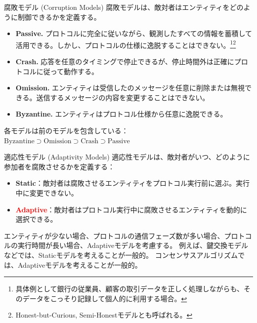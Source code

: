 \documentclass[aspectratio=169,10pt]{beamer}
\newenvironment{outlineblock}[1][]
{\begin{tcolorbox}[colframe=black, colback=white, boxrule=1pt, boxsep=5pt]}
{\end{tcolorbox}}
\begin{document}
\begin{frame}{腐敗モデル (Corruption Models)}
腐敗モデルは、敵対者はエンティティをどのように制御できるかを定義する。

\vspace{0.5em}

\begin{itemize}
    \item \textbf{Passive. }プロトコルに完全に従いながら、観測したすべての情報を蓄積して活用できる。しかし、プロトコルの仕様に逸脱することはできない。\footnote{具体例として銀行の従業員、顧客の取引データを正しく処理しながらも、そのデータをこっそり記録して個人的に利用する場合。}\footnote{Honest-but-Curious, Semi-Honestモデルとも呼ばれる。}
    
    \item \textbf{Crash. }応答を任意のタイミングで停止できるが、停止時間外は正確にプロトコルに従って動作する。
    
    \item \textbf{Omission. }エンティティは受信したのメッセージを任意に削除または無視できる。送信するメッセージの内容を変更することはできない。
    
    \item \textbf{Byzantine. }エンティティはプロトコル仕様から任意に逸脱できる。
\end{itemize}

\vspace{0.5em}

\begin{outlineblock}[]
各モデルは前のモデルを包含している：$\text{Byzantine} \supset \text{Omission} \supset \text{Crash} \supset \text{Passive}$
\end{outlineblock}

\end{frame}

\begin{frame}{適応性モデル (Adaptivity Models)}
適応性モデルは、敵対者がいつ、どのように参加者を腐敗させるかを定義する：

\vspace{0.5em}

\begin{itemize}
    \item \textbf{Static}：敵対者は腐敗させるエンティティをプロトコル実行前に選ぶ。実行中に変更できない。
    
    \item \textbf{\textcolor{red}{Adaptive}}：敵対者はプロトコル実行中に腐敗させるエンティティを動的に選択できる。
\end{itemize}

\vspace{0.5em}

\begin{outlineblock}[]
エンティティが少ない場合、プロトコルの通信フェーズ数が多い場合、プロトコルの実行時間が長い場合、Adaptiveモデルを考慮する。
例えば、鍵交換モデルなどでは、Staticモデルを考えることが一般的。
コンセンサスアルゴリズムでは、Adaptiveモデルを考えることが一般的。
\end{outlineblock}
\end{frame}
\end{document}
